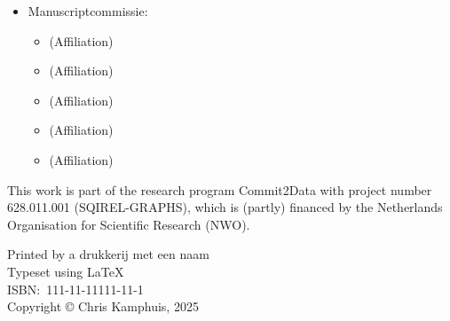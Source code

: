 \begin{itemize}
	\item[] Manuscriptcommissie:
	\begin{itemize}
		\item[]  (Affiliation)
		\item[]  (Affiliation)
		\item[]  (Affiliation)
		\item[]  (Affiliation)
		\item[]  (Affiliation)
	\end{itemize}
\end{itemize}

\vfill

\noindent%
\begin{minipage}[b][][b]{0.95\textwidth} %
	{
		\setlength{\parindent}{0cm}%
		This work is part of the research program Commit2Data with project number 628.011.001 (SQIREL-GRAPHS), which is (partly) financed by the Netherlands Organisation for Scientific Research (NWO).
		
	}
	
	\vspace{0.25cm}
	
	{
		\setlength{\parindent}{0cm}%
		Printed by a drukkerij met een naam\\[\baselineskip]
		Typeset using \LaTeX\\[\baselineskip]
		ISBN:\ 111{-}11{-}11111{-}11{-}1\\[\baselineskip]
		Copyright \copyright{} Chris Kamphuis, 2025\\[\baselineskip]
	}
\end{minipage}%
